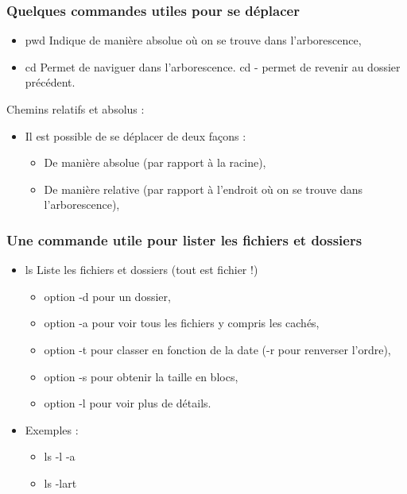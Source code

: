 \documentclass[handout,10pt]{beamer}
\begin{document}
\frame
{
    \frametitle{Quelques commandes utiles pour se déplacer}

    \begin{itemize}
        \item {\ttfamily pwd} Indique de manière absolue où on se trouve dans l'arborescence,
        \item {\ttfamily cd} Permet de naviguer dans l'arborescence. {\ttfamily cd -} permet de revenir au dossier précédent.
    \end{itemize}

    Chemins relatifs et absolus :

    \begin{itemize}
        \item Il est possible de se déplacer de deux façons :
            \begin{itemize}
                \item De manière absolue (par rapport à la racine),
                \item De manière relative (par rapport à l'endroit où on se trouve dans l'arborescence),
            \end{itemize}
    \end{itemize}
}


\frame
{
    \frametitle{Une commande utile pour lister les fichiers et dossiers}

    \begin{itemize}
      \item {\ttfamily ls} Liste les fichiers et dossiers (tout est fichier !)
            \begin{itemize}
                \item option -d pour un dossier,
                \item option -a pour voir tous les fichiers y compris les cachés,
                \item option -t pour classer en fonction de la date (-r pour renverser l'ordre),
                \item option -s pour obtenir la taille en blocs,
                \item option -l pour voir plus de détails.
            \end{itemize}
      \item Exemples :
            \begin{itemize}
                \item {\ttfamily ls -l -a}
                \item {\ttfamily ls -lart}
            \end{itemize}
    \end{itemize}
}
\end{document}
